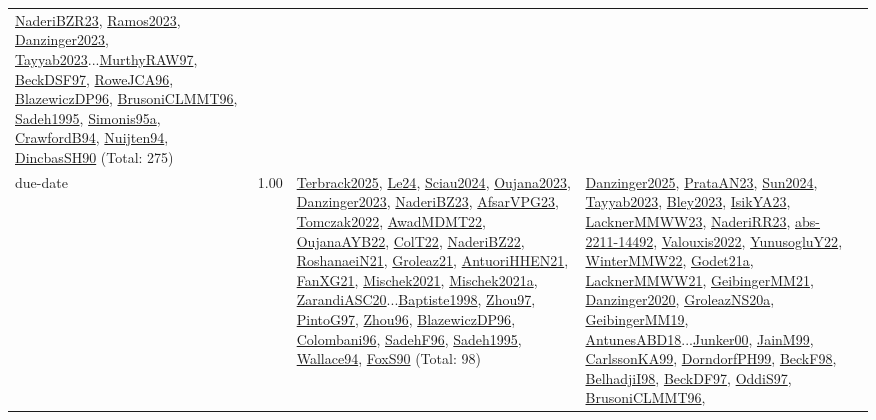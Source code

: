 {\begin{longtable}{p{3cm}r>{\raggedright\arraybackslash}p{6cm}>{\raggedright\arraybackslash}p{6cm}>{\raggedright\arraybackslash}p{8cm}}
\hyperref[detail:NaderiBZR23]{NaderiBZR23}, \hyperref[detail:Ramos2023]{Ramos2023}, \hyperref[detail:Danzinger2023]{Danzinger2023}, \hyperref[detail:Tayyab2023]{Tayyab2023}...\hyperref[detail:MurthyRAW97]{MurthyRAW97}, \hyperref[detail:BeckDSF97]{BeckDSF97}, \hyperref[detail:RoweJCA96]{RoweJCA96}, \hyperref[detail:BlazewiczDP96]{BlazewiczDP96}, \hyperref[detail:BrusoniCLMMT96]{BrusoniCLMMT96}, \hyperref[detail:Sadeh1995]{Sadeh1995}, \hyperref[detail:Simonis95a]{Simonis95a}, \hyperref[detail:CrawfordB94]{CrawfordB94}, \hyperref[detail:Nuijten94]{Nuijten94}, \hyperref[detail:DincbasSH90]{DincbasSH90} (Total: 275)\\
\index{due-date}\index{Concepts!due-date}due-date &  1.00 & \hyperref[detail:Terbrack2025]{Terbrack2025}, \hyperref[detail:Le24]{Le24}, \hyperref[detail:Sciau2024]{Sciau2024}, \hyperref[detail:Oujana2023]{Oujana2023}, \hyperref[detail:Danzinger2023]{Danzinger2023}, \hyperref[detail:NaderiBZ23]{NaderiBZ23}, \hyperref[detail:AfsarVPG23]{AfsarVPG23}, \hyperref[detail:Tomczak2022]{Tomczak2022}, \hyperref[detail:AwadMDMT22]{AwadMDMT22}, \hyperref[detail:OujanaAYB22]{OujanaAYB22}, \hyperref[detail:ColT22]{ColT22}, \hyperref[detail:NaderiBZ22]{NaderiBZ22}, \hyperref[detail:RoshanaeiN21]{RoshanaeiN21}, \hyperref[detail:Groleaz21]{Groleaz21}, \hyperref[detail:AntuoriHHEN21]{AntuoriHHEN21}, \hyperref[detail:FanXG21]{FanXG21}, \hyperref[detail:Mischek2021]{Mischek2021}, \hyperref[detail:Mischek2021a]{Mischek2021a}, \hyperref[detail:ZarandiASC20]{ZarandiASC20}...\hyperref[detail:Baptiste1998]{Baptiste1998}, \hyperref[detail:Zhou97]{Zhou97}, \hyperref[detail:PintoG97]{PintoG97}, \hyperref[detail:Zhou96]{Zhou96}, \hyperref[detail:BlazewiczDP96]{BlazewiczDP96}, \hyperref[detail:Colombani96]{Colombani96}, \hyperref[detail:SadehF96]{SadehF96}, \hyperref[detail:Sadeh1995]{Sadeh1995}, \hyperref[detail:Wallace94]{Wallace94}, \hyperref[detail:FoxS90]{FoxS90} (Total: 98) & \hyperref[detail:Danzinger2025]{Danzinger2025}, \hyperref[detail:PrataAN23]{PrataAN23}, \hyperref[detail:Sun2024]{Sun2024}, \hyperref[detail:Tayyab2023]{Tayyab2023}, \hyperref[detail:Bley2023]{Bley2023}, \hyperref[detail:IsikYA23]{IsikYA23}, \hyperref[detail:LacknerMMWW23]{LacknerMMWW23}, \hyperref[detail:NaderiRR23]{NaderiRR23}, \hyperref[detail:abs-2211-14492]{abs-2211-14492}, \hyperref[detail:Valouxis2022]{Valouxis2022}, \hyperref[detail:YunusogluY22]{YunusogluY22}, \hyperref[detail:WinterMMW22]{WinterMMW22}, \hyperref[detail:Godet21a]{Godet21a}, \hyperref[detail:LacknerMMWW21]{LacknerMMWW21}, \hyperref[detail:GeibingerMM21]{GeibingerMM21}, \hyperref[detail:Danzinger2020]{Danzinger2020}, \hyperref[detail:GroleazNS20a]{GroleazNS20a}, \hyperref[detail:GeibingerMM19]{GeibingerMM19}, \hyperref[detail:AntunesABD18]{AntunesABD18}...\hyperref[detail:Junker00]{Junker00}, \hyperref[detail:JainM99]{JainM99}, \hyperref[detail:CarlssonKA99]{CarlssonKA99}, \hyperref[detail:DorndorfPH99]{DorndorfPH99}, \hyperref[detail:BeckF98]{BeckF98}, \hyperref[detail:BelhadjiI98]{BelhadjiI98}, \hyperref[detail:BeckDF97]{BeckDF97}, \hyperref[detail:OddiS97]{OddiS97}, \hyperref[detail:BrusoniCLMMT96]{BrusoniCLMMT96}, 
\end{longtable}}
